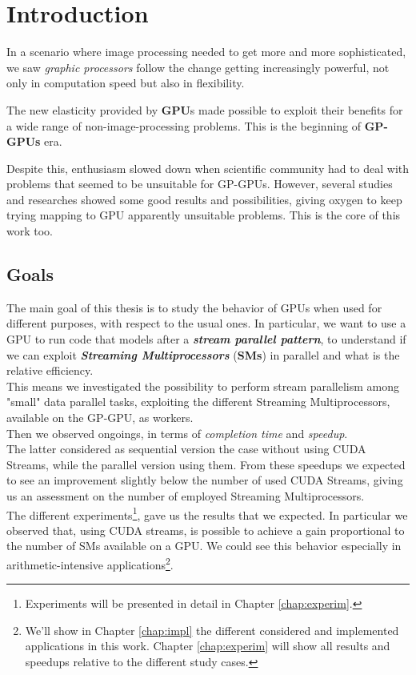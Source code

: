 
\chapter{Introduction}
\label{chap:intro}
In a scenario where image processing needed to get more and more sophisticated, we saw \textit{graphic processors} follow the change getting increasingly powerful, not only in computation speed but also in flexibility.

The new elasticity provided by \textbf{GPU}s made possible to exploit their benefits for a wide range of non-image-processing problems. This is the beginning of \textbf{GP-GPUs} era.

Despite this, enthusiasm slowed down when scientific community had to deal with problems that seemed to be unsuitable for GP-GPUs. However, several studies and researches showed some good results and possibilities, giving oxygen to keep trying mapping to GPU apparently unsuitable problems. This is the core of this work too.

\section{Goals}
	The main goal of this thesis is to study the behavior of GPUs when used for different purposes, with respect to the usual ones.
	In particular, we want to use a GPU to run code that models after a \textit{\textbf{stream parallel pattern}}, to understand if we can exploit \textbf{\textit{Streaming Multiprocessors}} (\textbf{SMs}) in parallel and what is the relative efficiency.\\
	This means we investigated the possibility to perform stream parallelism among "small" data parallel tasks, exploiting the different Streaming Multiprocessors, available on the GP-GPU, as workers. \\
	Then we observed ongoings, in terms of \textit{completion time} and \textit{speedup}.\\
	The latter considered as sequential version the case without using CUDA Streams, while the parallel version using them.
	From these speedups we expected to see an improvement slightly below the number of used CUDA Streams, giving us an assessment on the number of employed Streaming Multiprocessors.\\
	The different experiments\footnote{Experiments will be presented in detail in Chapter \ref{chap:experim}.}, gave us the results that we expected. In particular we observed that, using CUDA streams, is possible to achieve a gain proportional to the number of SMs available on a GPU. We could see this behavior especially in arithmetic-intensive applications\footnote{We'll show in Chapter \ref{chap:impl} the different considered and implemented applications in this work. Chapter \ref{chap:experim} will show all results and speedups relative to the different study cases.}.
	
